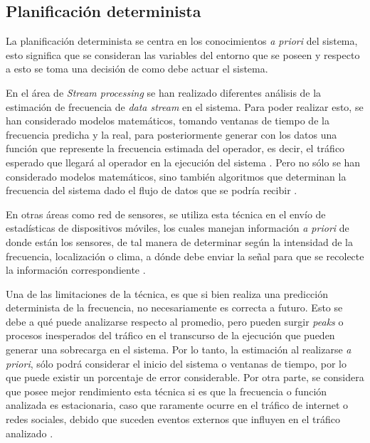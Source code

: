 \subsection{Planificación determinista}
\label{sec:planificacionBC}

La planificación determinista se centra en los conocimientos \textit{a priori} del sistema, esto significa que se consideran las variables del entorno que se poseen y respecto a esto se toma una decisión de como debe actuar el sistema. 

En el área de \textit{Stream processing} se han realizado diferentes análisis de la estimación de frecuencia de \textit{data stream} en el sistema. Para poder realizar esto, se han considerado modelos matemáticos, tomando ventanas de tiempo de la frecuencia predicha y la real, para posteriormente generar con los datos una función que represente la frecuencia estimada del operador, es decir, el tráfico esperado que llegará al operador en la ejecución del sistema \citep{Ganguly09}. Pero no sólo se han considerado modelos matemáticos, sino también algoritmos que determinan la frecuencia del sistema dado el flujo de datos que se podría recibir \citep{BhuvanagiriGKS06}.

En otras áreas como red de sensores, se utiliza esta técnica en el envío de estadísticas de dispositivos móviles, los cuales manejan información \textit{a priori} de donde están los sensores, de tal manera de determinar según la intensidad de la frecuencia, localización o clima, a dónde debe enviar la señal para que se recolecte la información correspondiente \citep{DongTS07}.

Una de las limitaciones de la técnica, es que si bien realiza una predicción determinista de la frecuencia, no necesariamente es correcta a futuro. Esto se debe a qué puede analizarse respecto al promedio, pero pueden surgir \textit{peaks} o procesos inesperados del tráfico en el transcurso de la ejecución que pueden generar una sobrecarga en el sistema. Por lo tanto, la estimación al realizarse \textit{a priori}, sólo podrá considerar el inicio del sistema o ventanas de tiempo, por lo que puede existir un porcentaje de error considerable. Por otra parte, se considera que posee mejor rendimiento esta técnica si es que la frecuencia o función analizada es estacionaria, caso que raramente ocurre en el tráfico de internet o redes sociales, debido que suceden eventos externos que influyen en el tr\'afico analizado \citep{KarpSP03}.


